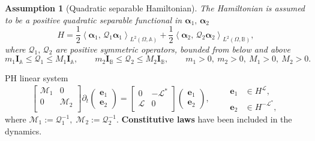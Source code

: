 \documentclass[aspectratio=169]{ISAE-Beamer}
\newcommand{\inner}[3][]{\ensuremath{\left\langle #2, \, #3 \right\rangle_{#1}}}
\newtheorem{assumption}{Assumption}
\begin{document}
\begin{frame}
	\begin{assumption}[Quadratic separable Hamiltonian]
		The Hamiltonian is assumed to be a positive quadratic separable functional in $\bm{\alpha}_1, \, \bm{\alpha}_2$ 
		\begin{equation*}
			H = \frac{1}{2} \inner[L^2(\Omega, \mathbb{A})]{\bm{\alpha}_{1}}{\mathcal{Q}_1\bm{\alpha}_{1}} + \frac{1}{2} \inner[L^2(\Omega, \mathbb{B})]{\bm{\alpha}_{2}}{\mathcal{Q}_2\bm{\alpha}_{2}},
		\end{equation*}
		where $\mathcal{Q}_1, \, \mathcal{Q}_2$ are positive symmetric operators, bounded from below and above
		\begin{equation*}
			m_1 \bm{I}_\mathbb{A} \le\mathcal{Q}_1 \le M_1 \bm{I}_\mathbb{A}, \qquad  m_2 \bm{I}_\mathbb{B} \le \mathcal{Q}_2 \le M_2 \bm{I}_\mathbb{B}, \qquad m_1>0, \ m_2>0, \ M_1>0, \ M_2>0.
		\end{equation*} 
	\end{assumption}
	
	
	\begin{exampleblock}{PH linear system}
		\begin{equation*}
			\begin{bmatrix}
				\mathcal{M}_1 & 0 \\
				0 & \mathcal{M}_2 \\
			\end{bmatrix}
			\partial_t \begin{pmatrix}
				\bm{e}_1 \\ \bm{e}_2
			\end{pmatrix} = \begin{bmatrix}
				0 &  - \mathcal{L}^* \\
				\mathcal{L} & 0 \\
			\end{bmatrix}\begin{pmatrix}
				\bm{e}_1 \\ \bm{e}_2
			\end{pmatrix} , \qquad \begin{aligned}
				\bm{e}_1 &\in H^{\mathcal{L}}, 	\\
				\bm{e}_2 &\in H^{-\mathcal{L}^*},
			\end{aligned}
		\end{equation*}
		where $\mathcal{M}_1:=\mathcal{Q}_1^{-1},\; \mathcal{M}_2:=\mathcal{Q}_2^{-1}$. \textbf{Constitutive laws} have been included in the dynamics.
	\end{exampleblock}
	
\end{frame}
\end{document}
